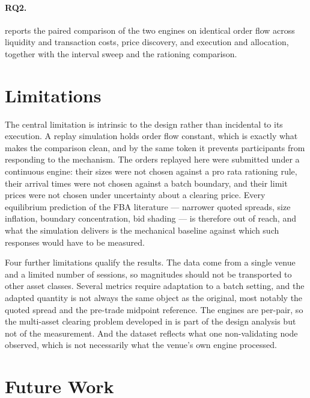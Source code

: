 \paragraph{RQ2.}  reports the paired comparison of the
two engines on identical order flow across liquidity and transaction
costs, price discovery, and execution and allocation, together with the
interval sweep and the rationing comparison.

\section{Limitations}
\label{sec:limitations}

The central limitation is intrinsic to the design rather than incidental
to its execution. A replay simulation holds order flow constant, which
is exactly what makes the comparison clean, and by the same token it
prevents participants from responding to the mechanism. The orders
replayed here were submitted under a continuous engine: their sizes were
not chosen against a pro rata rationing rule, their arrival times were
not chosen against a batch boundary, and their limit prices were not
chosen under uncertainty about a clearing price. Every equilibrium
prediction of the FBA literature --- narrower quoted spreads, size
inflation, boundary concentration, bid shading --- is therefore out of
reach, and what the simulation delivers is the mechanical baseline
against which such responses would have to be measured.

Four further limitations qualify the results. The data come from a
single venue and a limited number of sessions, so magnitudes should not
be transported to other asset classes. Several metrics require
adaptation to a batch setting, and the adapted quantity is not always
the same object as the original, most notably the quoted spread and the
pre-trade midpoint reference. The engines are per-pair, so the
multi-asset clearing problem developed in  is part of
the design analysis but not of the measurement. And the dataset reflects
what one non-validating node observed, which is not necessarily what the
venue's own engine processed.

\section{Future Work}
\label{sec:futurework}

